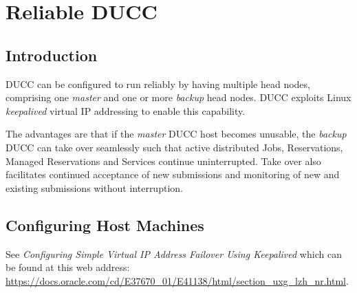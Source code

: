 % 
% 
% 
% 

\let\oldv\verbatim
\let\oldendv\endverbatim

\def\greybatim{\par\setbox0\vbox\bgroup\oldv}
\def\endgreybatim{\oldendv\egroup\fboxsep0pt \noindent\colorbox[gray]{0.8}{\usebox0}\par}

\ifpdf
\else
{}
\fi

\chapter{Reliable DUCC}
\label{chap:reliable}

\section{Introduction}
    DUCC can be configured to run reliably by having multiple head nodes,
    comprising one {\em master} and one or more {\em backup} head nodes.
    DUCC exploits Linux {\em keepalived} virtual IP addressing to enable
    this capability.
    
    The advantages are that if the {\em master} DUCC host becomes
    unusable, the {\em backup} DUCC can take over seamlessly
    such that active distributed Jobs, Reservations, Managed Reservations 
    and Services continue uninterrupted.  Take over also facilitates
    continued acceptance of new submissions and monitoring of new and
    existing submissions without interruption.
        
\section{Configuring Host Machines}    
    See {\em Configuring Simple Virtual IP Address Failover Using Keepalived} 
    which can be found at this web address: 
    \url{https://docs.oracle.com/cd/E37670_01/E41138/html/section_uxg_lzh_nr.html}.

